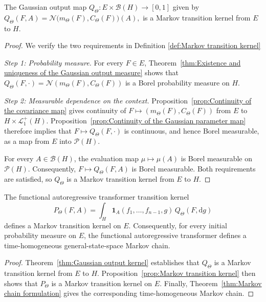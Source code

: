 \begin{theorem}
\label{thm:Gaussian output kernel}
The Gaussian output map
\(
Q_\Theta:
E\times\mathcal B(H)
\to
[0,1]\)
given by \(
Q_\Theta(F,A)
=
\mathcal N
\bigl(
m_\Theta(F),
C_\Theta(F)
\bigr)(A),
\)
is a Markov transition kernel from \(E\) to \(H\).
\end{theorem}

\begin{proof}
We verify the two requirements in Definition \ref{def:Markov transition kernel}

\textit{Step 1: Probability measure.}
For every \(F\in E\), Theorem~\ref{thm:Existence and uniqueness of the Gaussian output measure} shows that \(Q_\Theta(F,\cdot)=\mathcal N(m_\Theta(F),C_\Theta(F))\) is a Borel probability measure on \(H\).

\textit{Step 2: Measurable dependence on the context.}
Proposition~\ref{prop:Continuity of the covariance map} gives continuity of \(F\mapsto(m_\Theta(F),C_\Theta(F))\) from \(E\) to \(H\times\mathcal L_1^+(H)\). Proposition~\ref{prop:Continuity of the Gaussian parameter map} therefore implies that \(F\mapsto Q_\Theta(F,\cdot)\) is continuous, and hence Borel measurable, as a map from \(E\) into \(\mathcal P(H)\).

For every \(A\in\mathcal B(H)\), the evaluation map \(\mu\mapsto\mu(A)\) is Borel measurable on \(\mathcal P(H)\). Consequently, \(F\mapsto Q_\Theta(F,A)\) is Borel measurable. Both requirements are satisfied, so \(Q_\Theta\) is a Markov transition kernel from \(E\) to \(H\).
\end{proof}

\begin{corollary}
\label{cor:Well-posed functional autoregressive chain}
The functional autoregressive transformer transition kernel
\[
P_\Theta(F,A)
=
\int_H
\mathbf 1_A
(f_1,\ldots,f_{n-1},g)
\,Q_\Theta(F,\mathrm dg)
\]
defines a Markov transition kernel on \(E\). Consequently, for every initial probability measure on \(E\), the functional autoregressive transformer defines a time-homogeneous general-state-space Markov chain.
\end{corollary}

\begin{proof}
Theorem~\ref{thm:Gaussian output kernel} establishes that \(Q_\Theta\) is a Markov transition kernel from \(E\) to \(H\). Proposition~\ref{prop:Markov transition kernel} then shows that \(P_\Theta\) is a Markov transition kernel on \(E\). Finally, Theorem~\ref{thm:Markov chain formulation} gives the corresponding time-homogeneous Markov chain.
\end{proof}

